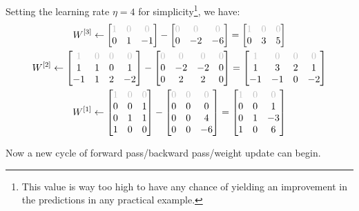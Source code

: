 Setting the learning rate $\eta = 4$ for simplicity\footnote{This value is way too high to have any chance of yielding an improvement in the predictions in any practical example.}, we have: 
\begin{gather*}
    W^{[3]} \gets \mqty[
        \color{lightgray} 1 & \color{lightgray} 0 & \color{lightgray} 0 \\
        0 & 1 & -1
    ] - \mqty[
        \color{lightgray} 0 & \color{lightgray} 0 & \color{lightgray} 0 \\
        0 & -2 & -6
    ] = \mqty[
        \color{lightgray} 1 & \color{lightgray} 0 & \color{lightgray} 0 \\
        0 & 3 & 5
    ]\\
    W^{[2]} \gets \mqty[
        \color{lightgray} 1 & \color{lightgray} 0 & \color{lightgray} 0 & \color{lightgray} 0\\
        1 & 1 & 0 & 1\\
        -1 & 1 & 2 & -2
    ] - \mqty[
        \color{lightgray} 0 & \color{lightgray} 0 & \color{lightgray} 0 & \color{lightgray} 0 \\
        0 & -2 & -2 & 0 \\
        0 & 2 & 2 & 0 \\
    ] = \mqty[
        \color{lightgray} 1 & \color{lightgray} 0 & \color{lightgray} 0 & \color{lightgray} 0\\
        1 & 3 & 2 & 1\\
        -1 & -1 & 0 & -2
    ]\\
    W^{[1]} \gets \mqty[
        \color{lightgray} 1 & \color{lightgray} 0 & \color{lightgray} 0 \\
        0 & 0 & 1 \\
        0 & 1 & 1 \\
        1 & 0 & 0
    ] - \mqty[
        \color{lightgray} 0 & \color{lightgray} 0 & \color{lightgray} 0 \\
        0 & 0 & 0 \\
        0 & 0 & 4 \\
        0 & 0 & -6
    ] = \mqty[
        \color{lightgray} 1 & \color{lightgray} 0 & \color{lightgray} 0 \\
        0 & 0 & 1 \\
        0 & 1 & -3 \\
        1 & 0 & 6
    ]
\end{gather*}

Now a new cycle of forward pass/backward pass/weight update can begin.
